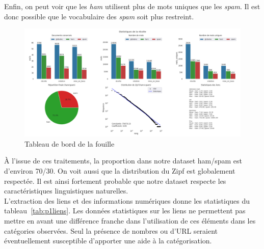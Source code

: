     Enfin, on peut voir que les \emph{ham} utilisent plus de mots uniques que les \emph{spam}.
    Il est donc possible que le vocabulaire des \emph{spam} soit plus restreint.
    \begin{figure}[H]
        \includegraphics[width=\linewidth]{img/fouilleStats}
        \caption{Tableau de bord de la fouille}
        \label{fig:dashFouille}
    \end{figure}

    À l'issue de ces traitements, la proportion dans notre dataset ham/spam est d'environ 70/30.
    On voit aussi que la distribution du Zipf est globalement respectée.
    Il est ainsi fortement probable que notre dataset respecte les caractéristiques linguistiques naturelles.\\

    L'extraction des liens et des informations numériques donne les statistiques du tableau~\ref{tab:p1liens}.
    Les données statistiques sur les liens ne permettent pas mettre en avant une différence franche dans l'utilisation de ces éléments dans les catégories observées.
    Seul la présence de nombres ou d'URL seraient éventuellement susceptible d'apporter une aide à la catégorisation.
    

